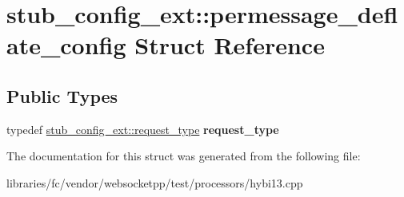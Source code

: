 \hypertarget{structstub__config__ext_1_1permessage__deflate__config}{}\section{stub\+\_\+config\+\_\+ext\+:\+:permessage\+\_\+deflate\+\_\+config Struct Reference}
\label{structstub__config__ext_1_1permessage__deflate__config}
\subsection*{Public Types}
\begin{DoxyCompactItemize}
\item 
\mbox{\label{structstub__config__ext_1_1permessage__deflate__config_a2873c88b37bc67f108fe532cc31810fa}} 
typedef \mbox{\hyperlink{classwebsocketpp_1_1http_1_1parser_1_1request}{stub\+\_\+config\+\_\+ext\+::request\+\_\+type}} {\bfseries request\+\_\+type}
\end{DoxyCompactItemize}


The documentation for this struct was generated from the following file\+:\begin{DoxyCompactItemize}
\item 
libraries/fc/vendor/websocketpp/test/processors/hybi13.\+cpp\end{DoxyCompactItemize}
